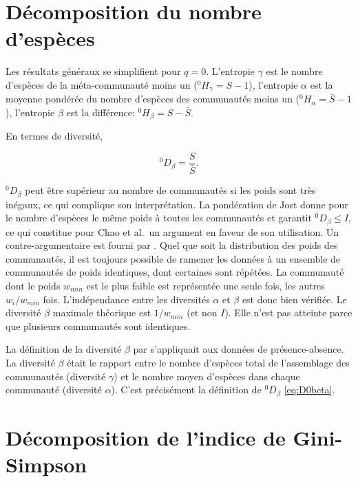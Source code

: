 \documentclass[
  11pt,
  french,
  a4paper,
  extrafontsizes,onecolumn,openright
  ]{memoir}
\begin{document}
\normalsize

\hypertarget{duxe9composition-du-nombre-despuxe8ces}{%
\section{Décomposition du nombre d'espèces}\label{duxe9composition-du-nombre-despuxe8ces}}

Les résultats généraux se simplifient pour \(q=0\).
L'entropie \(\gamma\) est le nombre d'espèces de la méta-communauté moins un (\(^{0}\!H_{\gamma}=S-1\)), l'entropie \(\alpha\) est la moyenne pondérée du nombre d'espèces des communautés moins un (\(^{0}\!H_{\alpha}=\bar{S}-1\)), l'entropie \(\beta\) est la différence: \(^{0}\!H_{\beta}=S-\bar{S}\).

En termes de diversité,

\begin{equation}
  \label{eq:D0beta}
  ^{0}\!D_{\beta}=\frac{S}{\bar{S}}.
\end{equation}

\(^{0}\!D_{\beta}\) peut être supérieur au nombre de communautés \autocite{Chao2012a} si les poids sont très inégaux, ce qui complique son interprétation.
La pondération de Jost donne pour le nombre d'espèces le même poids à toutes les communautés et garantit \(^{0}\!D_{\beta}\le I\), ce qui constitue pour Chao et al.~un argument en faveur de son utilisation.
Un contre-argumentaire est fourni par \textcite{Marcon2014a}.
Quel que soit la distribution des poids des communautés, il est toujours possible de ramener les données à un ensemble de communautés de poids identiques, dont certaines sont répétées.
La communauté dont le poids \(w_{min}\) est le plus faible est représentée une seule fois, les autres \({w_i}/{w_{min}}\) fois.
L'indépendance entre les diversités \(\alpha\) et \(\beta\) est donc bien vérifiée.
Le diversité \(\beta\) maximale théorique est \({1}/{w_{min}}\) (et non \(I\)).
Elle n'est pas atteinte parce que plusieurs communautés sont identiques.

La définition de la diversité \(\beta\) par \textcite{Whittaker1960} s'appliquait aux données de présence-absence.
La diversité \(\beta\) était le rapport entre le nombre d'espèces total de l'assemblage des communautés (diversité \(\gamma\)) et le nombre moyen d'espèces dans chaque communauté (diversité \(\alpha\)).
C'est précisément la définition de \(^{0}\!D_{\beta}\) \eqref{eq:D0beta}.

\hypertarget{duxe9composition-de-lindice-de-gini-simpson}{%
\section{Décomposition de l'indice de Gini-Simpson}\label{duxe9composition-de-lindice-de-gini-simpson}}
\end{document}
